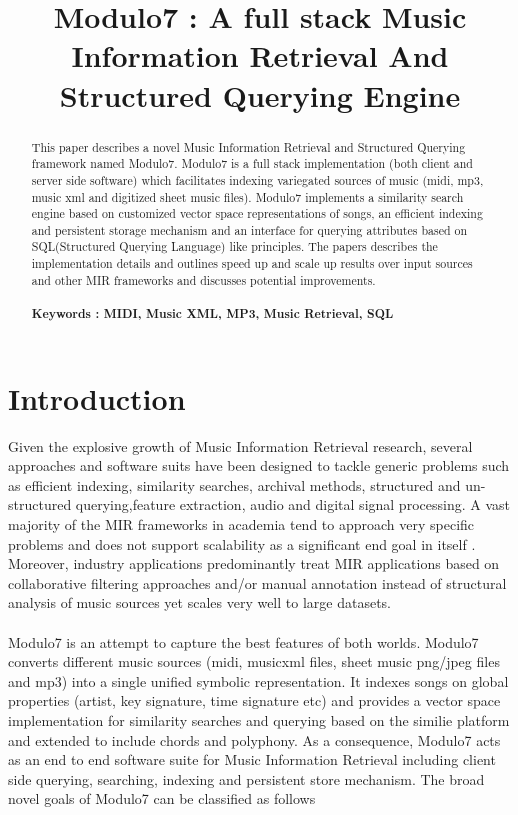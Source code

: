 \documentclass{article}
\title{Modulo7 : A full stack Music Information Retrieval And Structured Querying Engine}
\begin{document}
%
\maketitle
%
\begin{abstract}
This paper describes a novel Music Information Retrieval and Structured Querying framework named Modulo7. Modulo7 is a full stack implementation (both client and server side software) which facilitates indexing variegated sources of music (midi, mp3, music xml and digitized sheet music files). Modulo7 implements a similarity search engine based on customized vector space representations of songs, an efficient indexing and persistent storage mechanism and an interface for querying attributes based on SQL(Structured Querying Language) like principles. The papers describes the implementation details and outlines speed up and scale up results over input sources and other MIR frameworks and discusses potential improvements. \\\\
\textbf{Keywords : MIDI, Music XML, MP3, Music Retrieval, SQL}
\end{abstract}
%
\section{Introduction}\label{sec:introduction}

Given the explosive growth of Music Information Retrieval research, several approaches and software suits have been designed to tackle generic problems such as efficient indexing, similarity searches, archival methods, structured and un-structured querying,feature extraction, audio and digital signal processing. A vast majority of the MIR frameworks in academia tend to approach very specific problems and does not support scalability as a significant end goal in itself \cite{mirproblems}. Moreover, industry applications predominantly treat MIR applications based on collaborative filtering approaches \cite{amazonreco} and/or manual annotation \cite{musicgenomepandora} instead of structural analysis of music sources yet scales very well to large datasets. \\\\
Modulo7 is an attempt to capture the best features of both worlds. Modulo7 converts different music sources (midi, musicxml files, sheet music png/jpeg files and mp3) into a single unified symbolic representation. It indexes songs on global properties (artist, key signature, time signature etc) and provides a vector space implementation for similarity searches and querying based on the similie \cite{similie} platform and extended to include chords and polyphony. As a consequence, Modulo7 acts as an end to end software suite for Music Information Retrieval including client side querying, searching, indexing and persistent store mechanism. The broad novel goals of Modulo7 can be classified as follows
\end{document}
